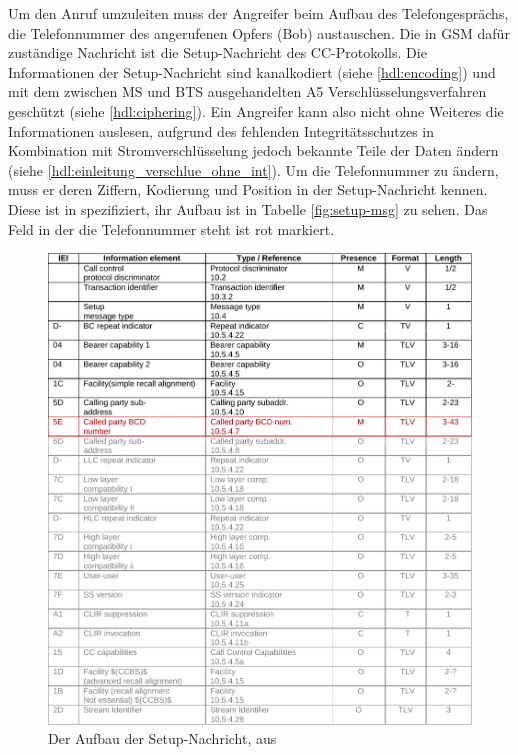 Um den Anruf umzuleiten muss der Angreifer beim Aufbau des Telefongesprächs, die Telefonnummer des angerufenen Opfers (Bob) austauschen. 
Die in \ac{GSM} dafür zuständige Nachricht ist die Setup-Nachricht des \ac{CC}-Protokolls. Die Informationen der Setup-Nachricht sind kanalkodiert (siehe \autoref{hdl:encoding}) und mit dem zwischen \ac{MS} und \ac{BTS} ausgehandelten \ac{A5} Verschlüsselungsverfahren geschützt (siehe \autoref{hdl:ciphering}). Ein Angreifer kann also nicht ohne Weiteres die Informationen auslesen, aufgrund des fehlenden Integritätsschutzes in Kombination mit Stromverschlüsselung jedoch bekannte Teile der Daten ändern (siehe \autoref{hdl:einleitung_verschlue_ohne_int}). Um die Telefonnummer zu ändern, muss er deren Ziffern, Kodierung und Position in der Setup-Nachricht kennen. Diese ist in  spezifiziert, ihr Aufbau ist in Tabelle \autoref{fig:setup-msg} zu sehen. Das Feld in der die Telefonnummer steht ist rot markiert.

\begin{figure}[H]
	\centering \includegraphics[width=1.0\linewidth]{figures/24008_tab_9-70a.pdf}
	\caption[Der Aufbau der Setup-Nachricht]{Der Aufbau der Setup-Nachricht, aus \citep[Tabelle 9.70a]{3gpp:24.008}} \label{fig:setup-msg}
\end{figure}

